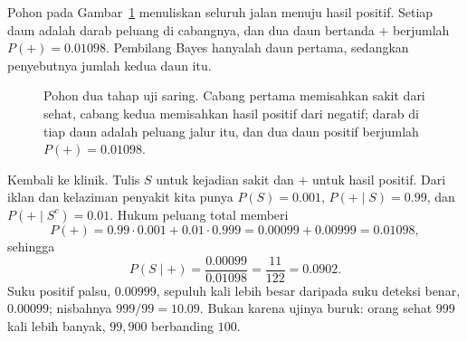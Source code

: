 Pohon pada Gambar~\ref{fig:pohon} menuliskan seluruh jalan menuju hasil positif. Setiap
daun adalah darab peluang di cabangnya, dan dua daun bertanda $+$ berjumlah
$P(+)=0.01098$. Pembilang Bayes hanyalah daun pertama, sedangkan penyebutnya jumlah
kedua daun itu.

    \begin{figure}[htbp]
\centering
{}
\caption{Pohon dua tahap uji saring. Cabang pertama memisahkan sakit dari sehat,
cabang kedua memisahkan hasil positif dari negatif; darab di tiap daun adalah peluang
jalur itu, dan dua daun positif berjumlah $P(+)=0.01098$.}
\label{fig:pohon}
\end{figure}    

Kembali ke klinik. Tulis $S$ untuk kejadian sakit dan $+$ untuk hasil positif. Dari
iklan dan kelaziman penyakit kita punya $P(S)=0.001$, $P(+\mid S)=0.99$, dan
$P(+\mid S^{c})=0.01$. Hukum peluang total memberi
\[
P(+)=0.99\cdot 0.001+0.01\cdot 0.999=0.00099+0.00999=0.01098,
\]
sehingga
\[
P(S\mid +)=\frac{0.00099}{0.01098}=\frac{11}{122}=0.0902 .
\]
Suku positif palsu, $0.00999$, sepuluh kali lebih besar daripada suku deteksi benar,
$0.00099$; nisbahnya $999/99=10.09$. Bukan karena ujinya buruk: orang sehat $999$ kali
lebih banyak, $99{,}900$ berbanding $100$.

